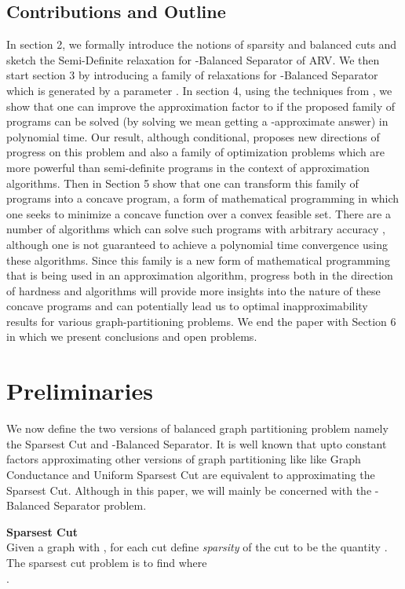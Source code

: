\documentclass [11pt,a4paper]{article}
\begin{document}
\subsection {Contributions and Outline}
In section 2, we formally introduce the notions of sparsity and balanced cuts and
sketch the Semi-Definite relaxation for -{\sc Balanced Separator}
of {\sf ARV}. We then start section 3 by introducing a family of relaxations for -{\sc Balanced Separator} 
which is generated by a parameter . In section 4, using the techniques from \cite{ARV}, 
we show that one can improve the approximation factor to  if
the proposed family of programs can be solved (by solving we mean getting a -approximate answer) 
in polynomial time. Our result, although conditional, proposes new directions of progress on this problem 
and also a family of optimization problems which are more powerful than semi-definite programs 
in the context of approximation algorithms. Then in Section 5 show that one can transform this 
family of programs into a concave program, a form of mathematical programming in which one seeks to minimize 
a concave function over a convex feasible set. There are a number of algorithms which can solve such 
programs with arbitrary accuracy \cite{H81,TTT85}, although one is not guaranteed to
achieve a polynomial time convergence using these algorithms. 
Since this family is a new form of mathematical programming 
that is being used in an approximation algorithm, progress both in the direction of hardness and algorithms 
will provide more insights into the nature of these concave programs and can potentially lead us to 
optimal inapproximability results for various graph-partitioning problems. We end the paper with Section 6
in which we present conclusions and open problems.

\section {Preliminaries}
We now define the two versions of balanced graph partitioning problem namely the 
{\sc Sparsest Cut} and {\sc -Balanced Separator}. It is well known that
upto constant factors approximating other versions of graph partitioning like
like {\sc Graph Conductance} and {\sc Uniform Sparsest Cut} are 
equivalent to approximating the {\sc Sparsest Cut}.
Although in this paper, we will mainly be concerned with the {\sc -Balanced Separator} problem. 

\textbf{{\sc Sparsest Cut}} \\
Given a graph  with , for each cut  define \emph{sparsity} of the cut to be the quantity . The sparsest cut problem is to find  where \\
. \\
\end{document}
